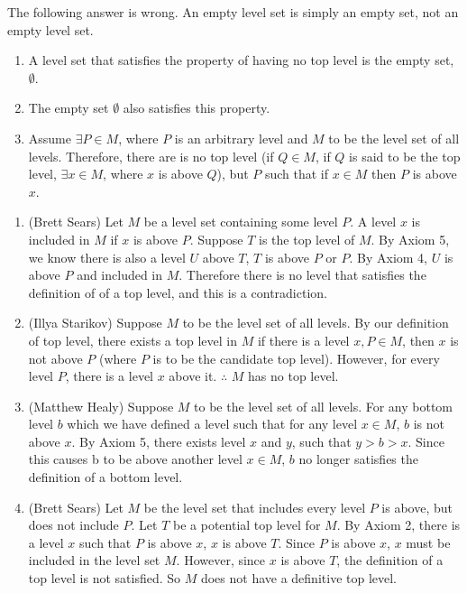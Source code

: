 \documentclass[12pt]{article}
\begin{document}
\problem
The following answer is wrong. An empty level set is simply an empty set, not an empty level set.

\begin{enumerate}[label=(\alph*)]
    \item A level set that satisfies the property of having no top level is the empty set, $\emptyset$.
    \item The empty set $\emptyset$ also satisfies this property.
    \item Assume $\exists P \in M$, where $P$ is an arbitrary level and $M$ to be the level set of all levels. Therefore, there are is no top level (if $Q \in M$, if $Q$ is said to be the top level, $\exists x \in M$, where $x$ is above $Q$), but $P$ such that if $x \in M$ then $P$ is above $x$.
\end{enumerate}


\begin{enumerate}[label=(\alph*)]
    \item (Brett Sears) Let $M$ be a level set containing some level $P$. A level $x$ is included in $M$ if $x$ is above $P$. Suppose $T$ is the top level of $M$. By Axiom 5, we know there is also a level $U$ above $T$, $T$ is above $P$ or $P$. By Axiom 4, $U$ is above $P$ and included in $M$. Therefore there is no level that satisfies the definition of of a top level, and this is a contradiction.

    \setcounter{enumi}{0} %

    \item (Illya Starikov) Suppose $M$ to be the level set of all levels. By our definition of top level, there exists a top level in $M$ if there is a level $x, P \in M$, then $x$ is not above $P$ (where $P$ is to be the candidate top level). However, for every level $P$, there is a level $x$ above it. $\therefore$ $M$ has no top level.

    \item (Matthew Healy) Suppose $M$ to be the level set of all levels. For any bottom level $b$ which we have defined a level such that for any level $x \in M$, $b$ is not above $x$. By Axiom 5, there exists level $x$ and $y$, such that $y > b > x$. Since this causes b to be above another level $x \in M$, $b$ no longer satisfies the definition of a bottom level.

    \item (Brett Sears) Let $M$ be the level set that includes every level $P$ is above, but does not include $P$. Let $T$ be a potential top level for $M$. By Axiom 2, there is a level $x$ such that $P$ is above $x$, $x$ is above $T$. Since $P$ is above $x$, $x$ must be included in the level set $M$. However, since $x$ is above $T$, the definition of a top level is not satisfied. So $M$ does not have a definitive top level.
\end{enumerate}
\end{document}
